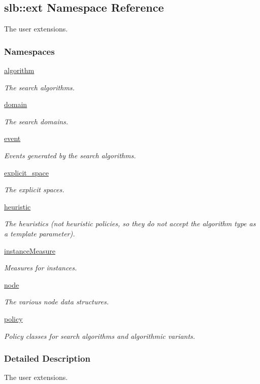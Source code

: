 \hypertarget{namespaceslb_1_1ext}{}\subsection{slb\+:\+:ext Namespace Reference}
\label{namespaceslb_1_1ext}


The user extensions.  


\subsubsection*{Namespaces}
\begin{DoxyCompactItemize}
\item 
 \hyperlink{namespaceslb_1_1ext_1_1algorithm}{algorithm}
\begin{DoxyCompactList}\small\item\em The search algorithms. \end{DoxyCompactList}\item 
 \hyperlink{namespaceslb_1_1ext_1_1domain}{domain}
\begin{DoxyCompactList}\small\item\em The search domains. \end{DoxyCompactList}\item 
 \hyperlink{namespaceslb_1_1ext_1_1event}{event}
\begin{DoxyCompactList}\small\item\em Events generated by the search algorithms. \end{DoxyCompactList}\item 
 \hyperlink{namespaceslb_1_1ext_1_1explicit__space}{explicit\+\_\+space}
\begin{DoxyCompactList}\small\item\em The explicit spaces. \end{DoxyCompactList}\item 
 \hyperlink{namespaceslb_1_1ext_1_1heuristic}{heuristic}
\begin{DoxyCompactList}\small\item\em The heuristics (not heuristic policies, so they do not accept the algorithm type as a template parameter). \end{DoxyCompactList}\item 
 \hyperlink{namespaceslb_1_1ext_1_1instanceMeasure}{instance\+Measure}
\begin{DoxyCompactList}\small\item\em Measures for instances. \end{DoxyCompactList}\item 
 \hyperlink{namespaceslb_1_1ext_1_1node}{node}
\begin{DoxyCompactList}\small\item\em The various node data structures. \end{DoxyCompactList}\item 
 \hyperlink{namespaceslb_1_1ext_1_1policy}{policy}
\begin{DoxyCompactList}\small\item\em Policy classes for search algorithms and algorithmic variants. \end{DoxyCompactList}\end{DoxyCompactItemize}


\subsubsection{Detailed Description}
The user extensions. 